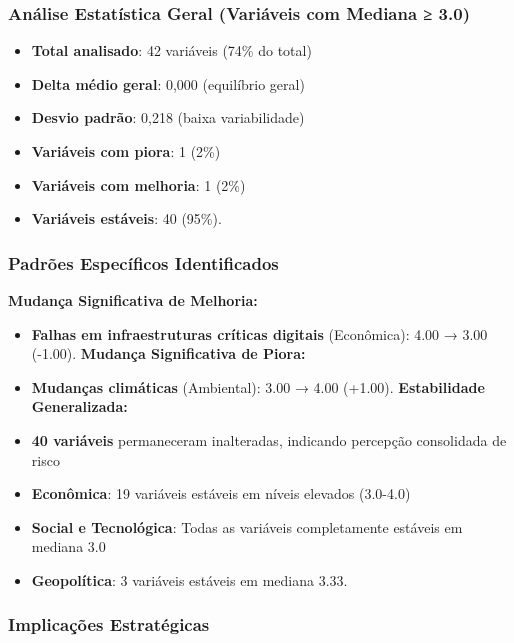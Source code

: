 \documentclass[
  portuguese,
  letterpaper,
  DIV=11,
  numbers=noendperiod]{scrreprt}
\providecommand{\tightlist}{%
  \setlength{\itemsep}{0pt}\setlength{\parskip}{0pt}}
\begin{document}
\subsubsection{Análise Estatística Geral (Variáveis com Mediana ≥
3.0)}\label{anuxe1lise-estatuxedstica-geral-variuxe1veis-com-mediana-3.0}

\begin{itemize}
\tightlist
\item
  \textbf{Total analisado}: 42 variáveis (74\% do total)
\item
  \textbf{Delta médio geral}: 0,000 (equilíbrio geral)
\item
  \textbf{Desvio padrão}: 0,218 (baixa variabilidade)
\item
  \textbf{Variáveis com piora}: 1 (2\%)
\item
  \textbf{Variáveis com melhoria}: 1 (2\%)
\item
  \textbf{Variáveis estáveis}: 40 (95\%).
\end{itemize}

\subsubsection{Padrões Específicos
Identificados}\label{padruxf5es-especuxedficos-identificados}

\textbf{Mudança Significativa de Melhoria:}

\begin{itemize}
\item
  \textbf{Falhas em infraestruturas críticas digitais} (Econômica): 4.00
  → 3.00 (-1.00). \textbf{Mudança Significativa de Piora:}
\item
  \textbf{Mudanças climáticas} (Ambiental): 3.00 → 4.00 (+1.00).
  \textbf{Estabilidade Generalizada:}
\item
  \textbf{40 variáveis} permaneceram inalteradas, indicando percepção
  consolidada de risco
\item
  \textbf{Econômica}: 19 variáveis estáveis em níveis elevados (3.0-4.0)
\item
  \textbf{Social e Tecnológica}: Todas as variáveis completamente
  estáveis em mediana 3.0
\item
  \textbf{Geopolítica}: 3 variáveis estáveis em mediana 3.33.
\end{itemize}

\subsubsection{Implicações
Estratégicas}\label{implicauxe7uxf5es-estratuxe9gicas-1}
\end{document}
